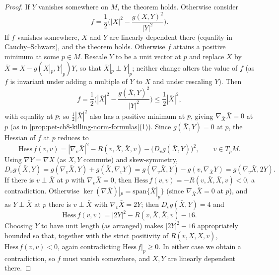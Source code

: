 \begin{proof}
  If $Y$ vanishes somewhere on $M$, the theorem holds. Otherwise consider
  \[
    f=\frac12\Big(|X|^2-\frac{g(X,Y)^2}{|Y|^2}\Big).
  \]
  If $f$ vanishes somewhere, $X$ and $Y$ are linearly dependent there
  (equality in Cauchy--Schwarz), and the theorem holds. Otherwise $f$ attains a
  positive minimum at some $p\in M$. Rescale $Y$ to be a unit vector at $p$ and
  replace $X$ by $\bar X=X-g(X|_p,Y|_p)Y$, so that $\bar X|_p\perp Y|_p$;
  neither change alters the value of $f$ (as $f$ is invariant under adding a
  multiple of $Y$ to $X$ and under rescaling $Y$). Then
  \[
    f=\frac12\Big(|\bar X|^2-\frac{g(\bar X,Y)^2}{|Y|^2}\Big)\le\frac12|\bar X|^2,
  \]
  with equality at $p$; so $\tfrac12|\bar X|^2$ also has a positive minimum at
  $p$, giving $\nabla_{\bar X}\bar X=0$ at $p$ (as in
  \cref{prop:pet-ch8-killing-norm-formulas}(1)). Since $g(\bar X,Y)=0$ at $p$,
  the Hessian of $f$ at $p$ reduces to
  \[
    \mathrm{Hess}\,f(v,v)=|\nabla_v\bar X|^2-R(v,\bar X,\bar X,v)-\big(D_vg(\bar X,Y)\big)^2,
    \qquad v\in T_pM.
  \]
  Using $\nabla Y=\nabla X$ (as $X,Y$ commute) and skew-symmetry,
  \[
    D_vg(\bar X,Y)=g(\nabla_v\bar X,Y)+g(\bar X,\nabla_vY)
    =g(\nabla_v\bar X,Y)-g(v,\nabla_{\bar X}Y)=g(\nabla_v\bar X,2Y).
  \]
  If there is $v\perp\bar X$ at $p$ with $\nabla_v\bar X=0$, then
  $\mathrm{Hess}\,f(v,v)=-R(v,\bar X,\bar X,v)<0$, a contradiction. Otherwise
  $\ker(\nabla\bar X)|_p=\mathrm{span}\{\bar X|_p\}$ (since $\nabla_{\bar X}\bar X=0$
  at $p$), and as $Y\perp\bar X$ at $p$ there is $v\perp\bar X$ with
  $\nabla_v\bar X=2Y$; then $D_vg(\bar X,Y)=4$ and
  \[
    \mathrm{Hess}\,f(v,v)=|2Y|^2-R(v,\bar X,\bar X,v)-16.
  \]
  Choosing $Y$ to have unit length (as arranged) makes $|2Y|^2-16$ appropriately
  bounded so that, together with the strict positivity of
  $R(v,\bar X,\bar X,v)$, $\mathrm{Hess}\,f(v,v)<0$, again contradicting
  $\mathrm{Hess}\,f|_p\ge0$. In either case we obtain a contradiction, so $f$
  must vanish somewhere, and $X,Y$ are linearly dependent there.
\end{proof}

